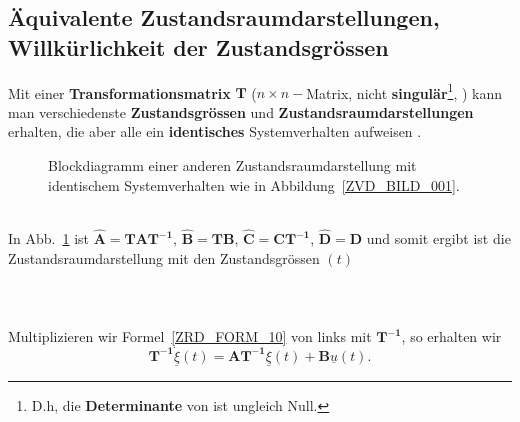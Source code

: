 \subsection{\"Aquivalente Zustandsraumdarstellungen, Willk\"urlichkeit der Zustandsgr\"ossen}
Mit einer {\bf Transformationsmatrix}
$\boldsymbol{T}$ ($n\times n-$Matrix, nicht {\bf
  singul\"ar}\footnote{D.h, die {\bf
  Determinante} von  ist ungleich Null.}, ) kann man
verschiedenste {\bf Zustandsgr\"ossen} und {\bf
  Zustandsraumdarstellungen} erhalten, die aber alle ein {\bf identisches} Systemverhalten aufweisen \cite{GIR:RAB:STE:05, HSU:95}.\\
\begin{figure}[!htb]
\vspace*{-4mm}\begin{center}
  \vspace*{-3mm}\caption{Blockdiagramm einer anderen Zustandsraumdarstellung mit identischem Systemverhalten wie in Abbildung~\ref{ZVD_BILD_001}.}\label{ZVD_BILD_002}
\end{center}
\vspace*{-6mm}
\end{figure}\\
\nit In Abb.~\ref{ZVD_BILD_002} ist $\boldsymbol{\hat{A}}=\boldsymbol{TAT^{-1}}$, $\boldsymbol{\hat{B}}=\boldsymbol{TB}$, $\boldsymbol{\hat{C}}=\boldsymbol{CT^{-1}}$, $\boldsymbol{\hat{D}}=\boldsymbol{D}$ und somit ergibt ist die 
Zustandsraumdarstellung mit den Zustandsgr\"ossen \vector{\xi}$(t)$\\~\\
\\~\\
Multiplizieren wir Formel~\ref{ZRD_FORM_10} von links mit
$\boldsymbol{T^{-1}}$, so erhalten wir 
\begin{equation*}
\boldsymbol{
    T^{-1}}\dot{\underline{\xi}}(t) = \boldsymbol{AT^{-1}}
  \underline{\xi}(t) + \boldsymbol{B} \underline{u}(t).
\end{equation*}
